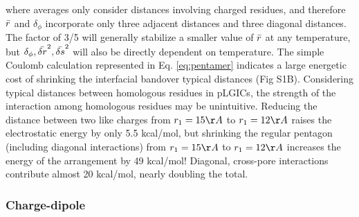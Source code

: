 \documentclass[journal=jacsat,manuscript=article]{achemso}
\newcommand{\sFigEnergy}{S1}
\newcommand{\plgics}{pLGICs}
\newcommand{\fivering}{interfacial band~}
\newcommand{\fiveringnos}{interfacial band}
\begin{document}
where averages only consider distances involving charged residues, and therefore $\bar{r}$ and $\delta_{\phi}$ incorporate only three adjacent distances and three diagonal distances.  The factor of 3/5 will generally stabilize a smaller value of $\bar{r}$ at any temperature, but $\delta_{\phi}, \bar{\delta r}^{2}, \bar{\delta s}^{2}$ will also be directly dependent on temperature. 
The simple Coulomb calculation represented in Eq. \ref{eq:pentamer} indicates a large energetic cost of shrinking the \fiveringnos over typical distances (Fig \sFigEnergy B).  Considering typical distances between homologous residues in \plgics, the strength of the interaction among homologous residues may be unintuitive.  %
Reducing the distance between two like charges from $r_{1}=15\AA$ to $r_{1}=12\AA$ raises the electrostatic energy by only 5.5 kcal/mol, but shrinking the regular pentagon (including diagonal interactions) from $r_{1}=15\AA$ to $r_{1}=12\AA$ increases the energy of the arrangement by 49 kcal/mol!  Diagonal, cross-pore interactions contribute almost 20 kcal/mol, nearly doubling the total.  
\subsubsection*{Charge-dipole}
\end{document}
